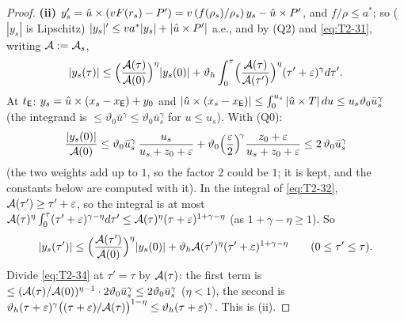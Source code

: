 \begin{proof}
\smallskip\textbf{(ii)} $y_s'=\hat u\times(vF(r_s)-P')=v\,(f(\rho_s)/\rho_s)\,y_s-\hat u\times P'$, and $f/\rho\le a^*$; so ($|y_s|$ is
Lipschitz) $|y_s|'\le va^*|y_s|+|\hat u\times P'|$ a.e., and by (Q2) and \eqref{eq:T2-31}, writing $\mathcal A:=\mathcal A_s$,
\begin{equation}\label{eq:T2-32}
|y_s(\tau)|\le\Bigl(\frac{\mathcal A(\tau)}{\mathcal A(0)}\Bigr)^{\eta}|y_s(0)|
+\vartheta_h\int_0^\tau\Bigl(\frac{\mathcal A(\tau)}{\mathcal A(\tau')}\Bigr)^{\eta}(\tau'+\varepsilon)^\gamma d\tau' .
\end{equation}
At $t_{\mathsf E}$: $y_s=\hat u\times(x_s-x_{\mathsf E})+y_0$ and
$|\hat u\times(x_s-x_{\mathsf E})|\le\int_0^{u_s}|\hat u\times T|\,du\le u_s\vartheta_0\bar u_s^\gamma$ (the integrand is
$\le\vartheta_0\bar u^\gamma\le\vartheta_0\bar u_s^\gamma$ for $u\le u_s$). With (Q0):
\begin{equation}\label{eq:T2-33}
\frac{|y_s(0)|}{\mathcal A(0)}\le\vartheta_0\bar u_s^\gamma\,\frac{u_s}{u_s+z_0+\varepsilon}
+\vartheta_0\Bigl(\frac\varepsilon2\Bigr)^{\!\gamma}\frac{z_0+\varepsilon}{u_s+z_0+\varepsilon}\le2\,\vartheta_0\bar u_s^\gamma
\end{equation}
(the two weights add up to $1$, so the factor $2$ could be $1$; it is kept, and the constants below are computed with it). In the
integral of \eqref{eq:T2-32}, $\mathcal A(\tau')\ge\tau'+\varepsilon$, so the integral is at most
$\mathcal A(\tau)^\eta\int_0^\tau(\tau'+\varepsilon)^{\gamma-\eta}d\tau'\le\mathcal A(\tau)^\eta(\tau+\varepsilon)^{1+\gamma-\eta}$ (as
$1+\gamma-\eta\ge1$). So
\begin{equation}\label{eq:T2-34}
|y_s(\tau')|\le\Bigl(\frac{\mathcal A(\tau')}{\mathcal A(0)}\Bigr)^{\eta}|y_s(0)|+\vartheta_h\mathcal A(\tau')^\eta(\tau'+\varepsilon)^{1+\gamma-\eta}
\qquad(0\le\tau'\le\tau).
\end{equation}
Divide \eqref{eq:T2-34} at $\tau'=\tau$ by $\mathcal A(\tau)$: the first term is
$\le(\mathcal A(\tau)/\mathcal A(0))^{\eta-1}\cdot2\vartheta_0\bar u_s^\gamma\le2\vartheta_0\bar u_s^\gamma$ ($\eta<1$), the second is
$\vartheta_h(\tau+\varepsilon)^\gamma\bigl((\tau+\varepsilon)/\mathcal A(\tau)\bigr)^{1-\eta}\le\vartheta_h(\tau+\varepsilon)^\gamma$.
This is (ii).


\end{proof}
